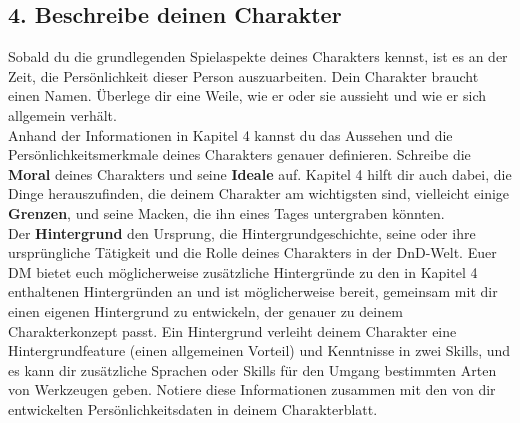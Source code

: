 \subsection{4. Beschreibe deinen Charakter}
Sobald du die grundlegenden Spielaspekte deines Charakters kennst, ist es an der Zeit, die Persönlichkeit dieser Person auszuarbeiten. Dein Charakter braucht einen Namen. Überlege dir eine Weile, wie er oder sie aussieht und wie er sich allgemein verhält. \\
Anhand der Informationen in Kapitel 4 kannst du das Aussehen und die Persönlichkeitsmerkmale deines Charakters genauer definieren. Schreibe die \textbf{Moral} deines Charakters und seine \textbf{Ideale} auf. Kapitel 4 hilft dir auch dabei, die Dinge herauszufinden, die deinem Charakter am wichtigsten sind, vielleicht einige \textbf{Grenzen}, und seine Macken, die ihn eines Tages untergraben könnten. \\
Der \textbf{Hintergrund} den Ursprung, die Hintergrundgeschichte, seine oder ihre ursprüngliche Tätigkeit und die Rolle deines Charakters in der DnD-Welt. Euer DM bietet euch möglicherweise zusätzliche Hintergründe zu den in Kapitel 4 enthaltenen Hintergründen an und ist möglicherweise bereit, gemeinsam mit dir einen eigenen Hintergrund zu entwickeln, der genauer zu deinem Charakterkonzept passt. Ein Hintergrund verleiht deinem Charakter eine Hintergrundfeature (einen allgemeinen Vorteil) und Kenntnisse in zwei Skills, und es kann dir zusätzliche Sprachen oder Skills für den Umgang bestimmten Arten von Werkzeugen geben. Notiere diese Informationen zusammen mit den von dir entwickelten Persönlichkeitsdaten in deinem Charakterblatt.

